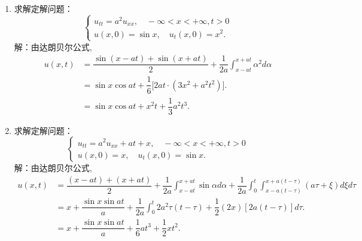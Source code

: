 \documentclass[11pt]{article}
\begin{document}
\begin{enumerate}
    \item 求解定解问题：
       \begin{equation*}
    \left\{
     \begin{array}{lr}
     u_{tt}=a^2u_{xx},\quad -\infty <x < +\infty, t>0\\u(x,0)=\sin x,\quad u_t(x,0)=x^2.
     \end{array}
    \right.
    \end{equation*}
        解：由达朗贝尔公式,
    \begin{align*}
    u(x,t)&=\dfrac{\sin(x-at)+\sin(x+at)}{2}+\dfrac{1}{2a}\displaystyle\int_{x-at}^{x+at}\alpha^2 d\alpha  \nonumber    \\[8pt]
        &=\sin x\cos at+\dfrac{1}{6}\big[2at\cdot (3x^2+a^2t^2)\big]. \nonumber    \\
        &=\sin x\cos at+x^{2}t+\dfrac{1}{3}a^2t^3.
    \end{align*}

    \item 求解定解问题：
       \begin{equation*}
    \left\{
     \begin{array}{lr}
     u_{tt}=a^2u_{xx}+at+x,\quad -\infty <x < +\infty, t>0\\u(x,0)=x,\quad u_t(x,0)=\sin x.
     \end{array}
    \right.
    \end{equation*}
        解：由达朗贝尔公式,
    \begin{align*}
    u(x,t)&=\dfrac{(x-at)+(x+at)}{2}+\dfrac{1}{2a}\displaystyle\int_{x-at}^{x+at}\sin\alpha d\alpha+\dfrac{1}{2a}\displaystyle\int_{0}^{t}\displaystyle\int_{x-a(t-\tau)}^{x+a(t-\tau)}(a\tau+\xi)d\xi d\tau  \nonumber    \\[8pt]
        &=x+\dfrac{\sin x\sin at}{a}+\dfrac{1}{2a}\displaystyle\int_{0}^{t}2a^2\tau(t-\tau)+\dfrac{1}{2}(2x)[2a(t-\tau)]d\tau. \nonumber    \\
        &=x+\dfrac{\sin x\sin at}{a}+\dfrac{1}{6}at^3+\dfrac{1}{2}xt^2.
    \end{align*}
    \end{enumerate}

    \setlength{\topmargin}{-18mm}
\end{document}
